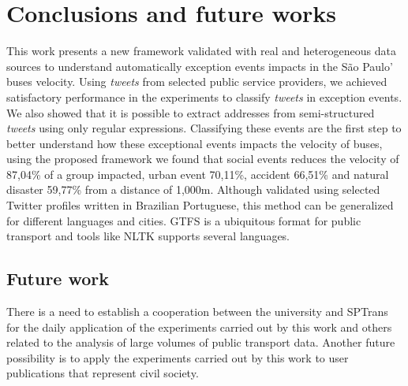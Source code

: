 \documentclass[runningheads]{llncs}
\begin{document}
\section{Conclusions and future works}

This work presents a new framework validated with real and heterogeneous data sources to understand automatically exception events impacts in the São Paulo' buses velocity. Using \textit{tweets} from selected public service providers, we achieved satisfactory performance in the experiments to classify \textit{tweets} in exception events. We also showed that it is possible to extract addresses from semi-structured \textit{tweets} using only regular expressions. Classifying these events are the first step to better understand how these exceptional events impacts the velocity of buses, using the proposed framework we found that social events reduces the velocity of 87,04\% of a group impacted, urban event 70,11\%, accident 66,51\% and natural disaster 59,77\% from a distance of 1,000m. Although validated using selected Twitter profiles written in Brazilian Portuguese, this method can be generalized for different languages and cities. GTFS is a ubiquitous format for public transport and tools like NLTK supports several languages.

\subsection{Future work}

There is a need to establish a cooperation between the university and SPTrans for the daily application of the experiments carried out by this work and others related to the analysis of large volumes of public transport data. Another future possibility is to apply the experiments carried out by this work to user publications that represent civil society.





\end{document}
